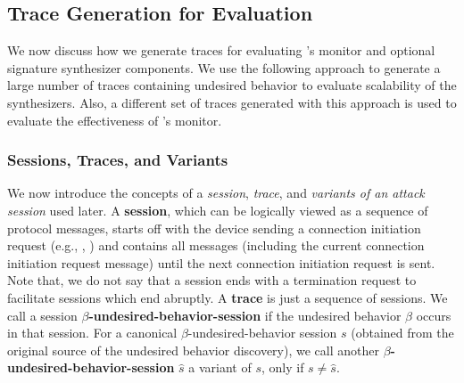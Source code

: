 \begin{table}[htbp]
  \centering
	\caption{Specifications of devices used for evaluation.}
	\label{tab:device_for_experiment}
\end{table}


\subsection{Trace Generation for Evaluation}\label{sec:trace_gathering}
We now discuss how we generate traces for evaluating \system{}'s monitor and
optional signature synthesizer components. We use the following approach
to generate a large number of  traces containing undesired behavior to evaluate scalability of the
synthesizers. Also, a different set of traces generated with this approach is used to evaluate the
effectiveness of \system's monitor.

\subsubsection{Sessions, Traces, and Variants}
We now introduce the concepts of a \emph{session}, \emph{trace}, and \emph{variants of an attack session} used later.
A \textbf{session}, which can be logically viewed as a sequence of protocol messages,
starts off with the device sending a connection initiation request (e.g., \rrcConnectionRequest,
\attachRequest) and contains all messages (including the current connection initiation request message)
until the next connection initiation request is sent. Note that, we do not say that a session ends with a termination request to
facilitate sessions which end abruptly.  A \textbf{trace} is just a sequence of
sessions. We call a session \textbf{$\beta$-undesired-behavior-session} if the undesired behavior $\beta$
occurs in that session. For a canonical $\beta$-undesired-behavior session $s$ (obtained from the original source
of the undesired behavior discovery), we call another \textbf{$\beta$-undesired-behavior-session} $\hat{s}$ a variant of $s$, only if
$s\neq\hat{s}$.


